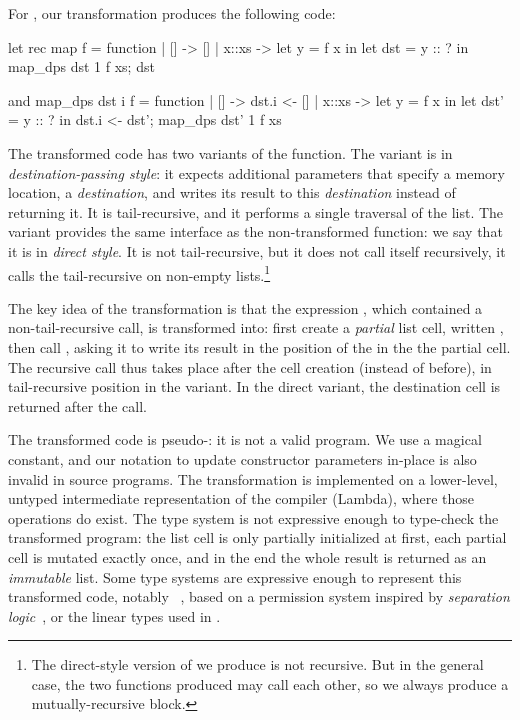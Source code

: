 For , our transformation produces the following code:\\
\hspace{-1.6em}
\begin{minipage}{0.5\linewidth}
\begin{Ocaml}
let rec map f = function
| [] -> []
| x::xs ->
  let y = f x in
  let dst = y :: ? in
  map_dps dst 1 f xs;
  dst
\end{Ocaml}
\end{minipage}
\hfill
\begin{minipage}{0.5\linewidth}
\begin{Ocaml}
and map_dps dst i f = function
| [] ->
  dst.i <- []
| x::xs ->
  let y = f x in
  let dst' = y :: ? in
  dst.i <- dst';
  map_dps dst' 1 f xs
\end{Ocaml}
\end{minipage}

The transformed code has two variants of the  function. The  variant is in \emph{destination-passing style}: it expects additional parameters that specify a memory location, a \emph{destination}, and writes its result to this \emph{destination} instead of returning it. It is tail-recursive, and it performs a single traversal of the list. The  variant provides the same interface as the non-transformed function: we say that it is in \emph{direct style}. It is not tail-recursive, but it does not call itself recursively, it calls the tail-recursive  on non-empty lists.\footnote{The direct-style version of  we produce is not recursive. But in the general case, the two functions produced may call each other, so we always produce a mutually-recursive block.}

The key idea of the transformation is that the expression , which contained a non-tail-recursive call, is transformed into: first create a \emph{partial} list cell, written , then call , asking it to write its result in the position of the  in the the partial cell. The recursive call thus takes place after the cell creation (instead of before), in tail-recursive position in the  variant. In the direct variant, the destination cell  is returned after the call.

The transformed code is pseudo-\OCaml: it is not a valid \OCaml
program. We use a magical  constant, and our notation
 to update constructor parameters in-place is also
invalid in source programs. The transformation is implemented on
a lower-level, untyped intermediate representation of the \OCaml
compiler (Lambda), where those operations do exist. The \OCaml type
system is not expressive enough to type-check the transformed program:
the list cell is only partially initialized at first, each partial
cell is mutated exactly once, and in the end the whole result is
returned as an \emph{immutable} list. Some type systems are expressive
enough to represent this transformed code, notably \Mezzo~\citep*{mezzo-2016}, based on a permission system inspired by \emph{separation logic}~\citep*{seplog-cacm-2019}, or the linear types used in \citet*{minamide-98}.

